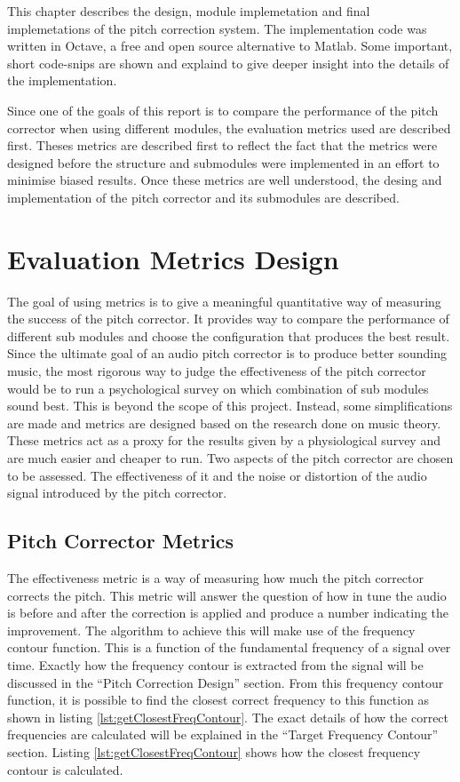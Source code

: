 
This chapter describes the design, module implemetation and final implemetations
of the pitch correction system. The implementation code was written in Octave, a
free and open source alternative to Matlab. Some important, short code-snips are
shown and explaind to give deeper insight into the details of the implementation.

Since one of the goals of this report is to compare the performance of the pitch
corrector when using different modules, the evaluation metrics used are described
first. Theses metrics are described first to reflect the fact that the metrics
were designed before the structure and submodules were implemented in an effort to
minimise biased results. Once these metrics are well understood, the desing and
implementation of the pitch corrector and its submodules are described.

\section{Evaluation Metrics Design}

The goal of using metrics is to give a meaningful quantitative way of measuring
the success of the pitch corrector. It provides way to compare the performance of
different sub modules and choose the configuration that produces the best result.
Since the ultimate goal of an audio pitch corrector is to produce better sounding
music, the most rigorous way to judge the effectiveness of the pitch corrector
would be to run a psychological survey on which combination of sub modules sound
best. This is beyond the scope of this project. Instead, some simplifications are
made and metrics are designed based on the research done on music theory. These
metrics act as a proxy for the results given by a physiological survey and are
much easier and cheaper to run. Two aspects of the pitch corrector are chosen to
be assessed. The effectiveness of it and the noise or distortion of the audio
signal introduced by the pitch corrector.

\subsection{Pitch Corrector Metrics}

The effectiveness metric is a way of measuring how much the pitch corrector
corrects the pitch. This metric will answer the question of how in tune the audio
is before and after the correction is applied and produce a number indicating the
improvement. The algorithm to achieve this will make use of the frequency contour
function. This is a function of the fundamental frequency of a signal over time.
Exactly how the frequency contour is extracted from the signal will be discussed
in the ``Pitch Correction Design'' section. From this frequency contour function,
it is possible to find the closest correct frequency to this function as shown in
listing \ref{lst:getClosestFreqContour}. The
exact details of how the correct frequencies are calculated will be explained in
the ``Target Frequency Contour'' section. Listing \ref{lst:getClosestFreqContour}
shows how the closest frequency contour is calculated.

